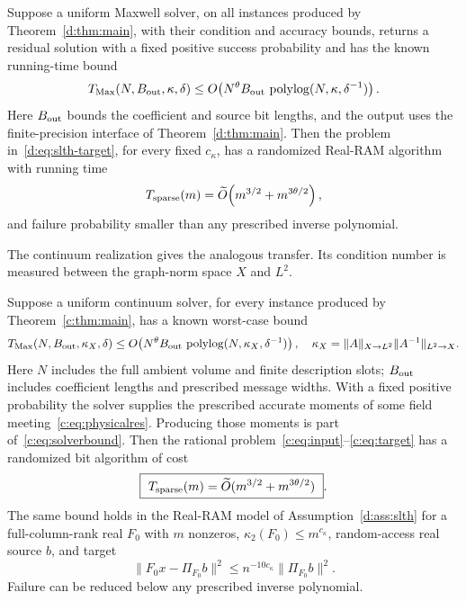 \begin{theorem}
\label{d:thm:algorithm-transfer}
Suppose a uniform Maxwell solver, on all instances produced by
Theorem~\ref{d:thm:main}, with their condition and accuracy bounds,
returns a residual solution with a fixed positive success probability
and has the known running-time bound
\begin{equation}
 T_{\rm Max}(N,B_{\rm out},\kappa,\delta)
 \le O\!\left(N^\theta B_{\rm out}\,
        \operatorname{polylog}(N,\kappa,\delta^{-1})\right).
 \label{d:eq:maxwell-solver-model}
\end{equation}
Here $B_{\rm out}$ bounds the coefficient and source bit lengths, and the output
uses the finite-precision interface of Theorem~\ref{d:thm:main}. Then the
problem in~\eqref{d:eq:slth-target}, for every fixed $c_\kappa$, has a randomized
Real-RAM algorithm with running time
\begin{equation}
 T_{\rm sparse}(m)
 =\widetilde O\!\left(m^{3/2}+m^{3\theta/2}\right),
 \label{d:eq:sparse-composition-time}
\end{equation}
and failure probability smaller than any prescribed inverse polynomial.
\end{theorem}

The continuum realization gives the analogous transfer. Its condition
number is measured between the graph-norm space $X$ and $L^2$.

\begin{theorem}
\label{c:thm:transfer}
Suppose a uniform continuum solver, for every instance produced by
Theorem~\ref{c:thm:main}, has a known worst-case bound
\begin{equation}
 T_{\rm Max}(N,B_{\rm out},\kappa_X,\delta)
 \le O\!\left(N^\theta B_{\rm out}\,
       \operatorname{polylog}(N,\kappa_X,\delta^{-1})\right),
 \quad \kappa_X=\|A\|_{X\to L^2}\|A^{-1}\|_{L^2\to X}.
                                                               \label{c:eq:solverbound}
\end{equation}
Here $N$ includes the full ambient volume and finite description slots;
$B_{\rm out}$ includes coefficient lengths and prescribed message widths. With a
fixed positive probability the solver supplies the prescribed accurate
moments of some field meeting~\eqref{c:eq:physicalres}. Producing those
moments is part of~\eqref{c:eq:solverbound}.
Then the rational problem~\eqref{c:eq:input}--\eqref{c:eq:target} has a
randomized bit algorithm of cost
\begin{equation}
 \boxed{\ T_{\rm sparse}(m)=
          \tO(m^{3/2}+m^{3\theta/2})\ }.             \label{c:eq:transfer}
\end{equation}
The same bound holds in the Real-RAM model of Assumption~\ref{d:ass:slth} for a
full-column-rank real $F_0$ with $m$ nonzeros, $\kappa_2(F_0)\le m^{c_\kappa}$,
random-access real source $b$, and target
\begin{equation}
 \|F_0x-\Pi_{F_0}b\|^2
      \le n^{-10c_\kappa}\|\Pi_{F_0}b\|^2.                 \label{c:eq:projectiontarget}
\end{equation}
Failure can be reduced below any prescribed inverse polynomial.
\end{theorem}

